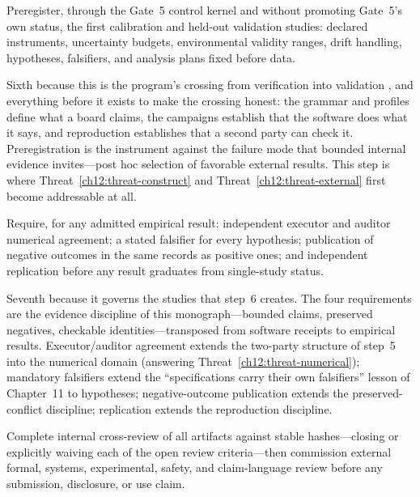 \begin{protocol}\label{ch12:step6}
Preregister, through the Gate~5 control kernel and without promoting Gate~5's own status, the first calibration and held-out validation studies: declared instruments, uncertainty budgets, environmental validity ranges, drift handling, hypotheses, falsifiers, and analysis plans fixed before data.
\end{protocol}

Sixth because this is the program's crossing from verification into validation \cite{sargent}, and everything before it exists to make the crossing honest: the grammar and profiles define what a board claims, the campaigns establish that the software does what it says, and reproduction establishes that a second party can check it. Preregistration is the instrument against the failure mode that bounded internal evidence invites---post hoc selection of favorable external results. This step is where Threat~\ref{ch12:threat-construct} and Threat~\ref{ch12:threat-external} first become addressable at all.

\begin{protocol}\label{ch12:step7}
Require, for any admitted empirical result: independent executor and auditor numerical agreement; a stated falsifier for every hypothesis; publication of negative outcomes in the same records as positive ones; and independent replication before any result graduates from single-study status.
\end{protocol}

Seventh because it governs the studies that step~6 creates. The four requirements are the evidence discipline of this monograph---bounded claims, preserved negatives, checkable identities---transposed from software receipts to empirical results. Executor/auditor agreement extends the two-party structure of step~5 into the numerical domain (answering Threat~\ref{ch12:threat-numerical}); mandatory falsifiers extend the ``specifications carry their own falsifiers'' lesson of Chapter~11 to hypotheses; negative-outcome publication extends the preserved-conflict discipline; replication extends the reproduction discipline.

\begin{protocol}\label{ch12:step8}
Complete internal cross-review of all artifacts against stable hashes---closing or explicitly waiving each of the open review criteria---then commission external formal, systems, experimental, safety, and claim-language review before any submission, disclosure, or use claim.
\end{protocol}

